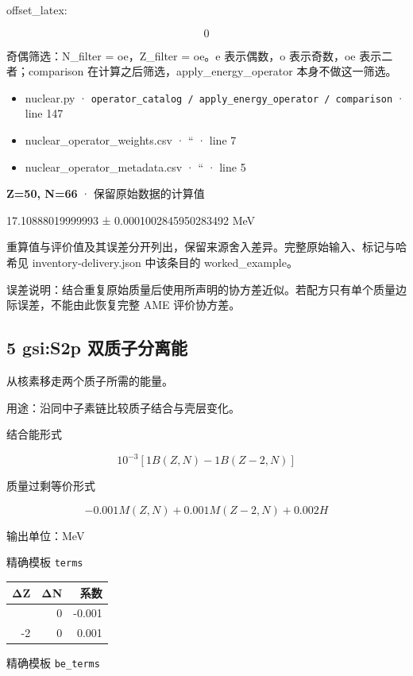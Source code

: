 \documentclass[
  11pt,
  letterpaper,
]{article}
\providecommand{\tightlist}{%
  \setlength{\itemsep}{0pt}\setlength{\parskip}{0pt}}
\begin{document}
offset\_latex:

\[
0
\]

奇偶筛选：N\_filter = oe，Z\_filter = oe。e 表示偶数，o 表示奇数，oe
表示二者；comparison 在计算之后筛选，apply\_energy\_operator
本身不做这一筛选。

\begin{itemize}
\tightlist
\item
  nuclear.py ·
  \texttt{operator\_catalog\ /\ apply\_energy\_operator\ /\ comparison}
  · line 147
\item
  nuclear\_operator\_weights.csv · `` · line 7
\item
  nuclear\_operator\_metadata.csv · `` · line 5
\end{itemize}

\textbf{Z=50, N=66} · 保留原始数据的计算值

17.10888019999993 ± 0.0001002845950283492 MeV

重算值与评价值及其误差分开列出，保留来源舍入差异。完整原始输入、标记与哈希见
inventory-delivery.json 中该条目的 worked\_example。

误差说明：结合重复原始质量后使用所声明的协方差近似。若配方只有单个质量边际误差，不能由此恢复完整
AME 评价协方差。

\subsection{5 gsi:S2p
双质子分离能}\label{gsis2p-ux53ccux8d28ux5b50ux5206ux79bbux80fd}

从核素移走两个质子所需的能量。

用途：沿同中子素链比较质子结合与壳层变化。

结合能形式

\[
10^{-3}[1B(Z,N)-1B(Z-2,N)]
\]

质量过剩等价形式

\[
-0.001M(Z,N)+0.001M(Z-2,N) + 0.002 H
\]

输出单位：MeV

精确模板 \texttt{terms}

\begin{longtable}[]{@{}rrr@{}}
\toprule\noalign{}
ΔZ & ΔN & 系数 \\
\midrule\noalign{}
\endhead
\bottomrule\noalign{}
\endlastfoot
0 & 0 & -0.001 \\
-2 & 0 & 0.001 \\
\end{longtable}

精确模板 \texttt{be\_terms}
\end{document}
